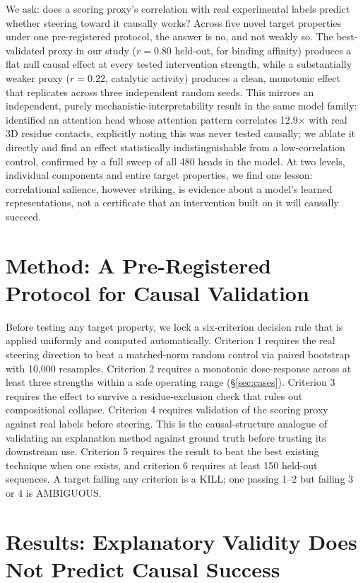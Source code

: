\documentclass{article}
\begin{document}
We ask: does a scoring proxy's correlation with real experimental labels
predict whether steering toward it causally works? Across five novel
target properties under one pre-registered protocol, the answer is no,
and not weakly so. The best-validated proxy in our study ($r=0.80$
held-out, for binding affinity) produces a flat null causal effect at
every tested intervention strength, while a substantially weaker proxy
($r=0.22$, catalytic activity) produces a clean, monotonic effect that
replicates across three independent random seeds. This mirrors an
independent, purely mechanistic-interpretability result in the same
model family: \citet{vig2021bertology} identified an attention head whose
attention pattern correlates 12.9$\times$ with real 3D residue contacts,
explicitly noting this was never tested causally; we ablate it directly
and find an effect statistically indistinguishable from a low-correlation
control, confirmed by a full sweep of all 480 heads in the model. At two
levels, individual components and entire target properties, we find one
lesson: correlational salience, however striking, is evidence about a
model's learned representations, not a certificate that an intervention
built on it will causally succeed.

\section{Method: A Pre-Registered Protocol for Causal Validation}
\label{sec:method}

Before testing any target property, we lock a six-criterion decision rule
that is applied uniformly and computed automatically. Criterion 1
requires the real steering direction to beat a matched-norm random
control via paired bootstrap with 10{,}000 resamples. Criterion 2 requires
a monotonic dose-response across at least three strengths within a safe
operating range (\S\ref{sec:cases}). Criterion 3 requires the effect to
survive a residue-exclusion check that rules out compositional collapse.
Criterion 4 requires validation of the scoring proxy against real labels
before steering. This is the causal-structure analogue of validating an
explanation method against ground truth before trusting its downstream
use. Criterion 5 requires the result to beat the best existing technique
when one exists, and criterion 6 requires at least 150 held-out
sequences. A target failing any criterion is a KILL; one passing 1--2 but
failing 3 or 4 is AMBIGUOUS.

\section{Results: Explanatory Validity Does Not Predict Causal Success}
\label{sec:sweep}
\end{document}

